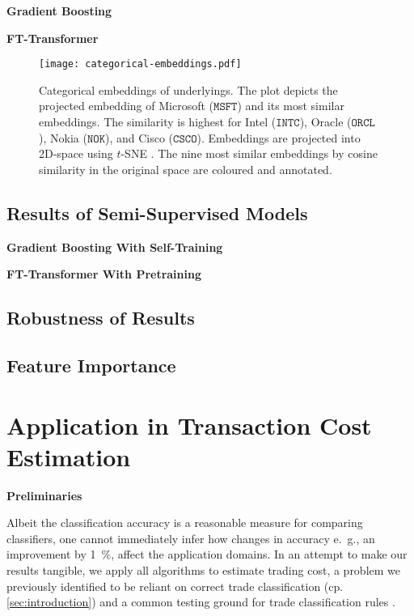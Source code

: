 \textbf{Gradient Boosting}

\textbf{FT-Transformer}

\begin{figure}[ht]
    \centering
    \texttt{[image: categorical-embeddings.pdf]}
    \caption[Categorical Embeddings of Underlyings]{Categorical embeddings of underlyings. The plot depicts the projected embedding of Microsoft ($\mathtt{MSFT}$) and its most similar embeddings. The similarity is highest for Intel ($\mathtt{INTC}$), Oracle ($\mathtt{ORCL}$), Nokia ($\mathtt{NOK}$), and Cisco ($\mathtt{CSCO}$). Embeddings are projected into 2D-space using $t$-SNE \autocite{vandermaatenVisualizingDataUsing2008}. The nine most similar embeddings by cosine similarity in the original space are coloured and annotated.}
    \label{fig:categorical-embeddings}
\end{figure}


\subsection{Results of Semi-Supervised
    Models}\label{sec:results-of-semi-supervised-models}

\textbf{Gradient Boosting With Self-Training}

\textbf{FT-Transformer With Pretraining}

\subsection{Robustness of Results}\label{sec:robustness-checks}

\subsection{Feature Importance}\label{sec:feature-importance}

\newpage
\section{Application in Transaction Cost Estimation}\label{sec:application}

\textbf{Preliminaries}


Albeit the classification accuracy is a reasonable measure for comparing classifiers, one cannot immediately infer how changes in accuracy e.~g., an improvement by \SI{1}{\percent}, affect the application domains. In an attempt to make our results tangible, we apply all algorithms to estimate trading cost, a problem we previously identified to be reliant on correct trade classification (cp. \cref{sec:introduction}) and a common testing ground for trade classification rules \autocites[cp.][541]{ellisAccuracyTradeClassification2000}[][569]{finucaneDirectTestMethods2000}[][271--278]{petersonEvaluationBiasesExecution2003}[][896--897]{savickasInferringDirectionOption2003}.

